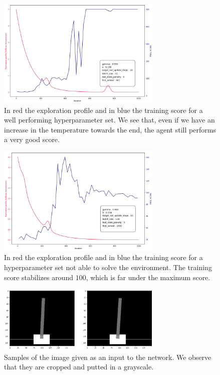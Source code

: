 \begin{figure}[h]
    \centering
    \includegraphics[width=0.7\textwidth]{Images/Good_Cartpole.png}
    \caption{In red the exploration profile and in blue the training score for a well performing hyperparameter set.
        We see that, even if we have an increase in the temperature towards the end, the agent still performs a very good score.}
    \label{fig:norm_cart}
\end{figure}

\begin{figure}[h]
    \centering
    \includegraphics[width=0.7\textwidth]{Images/Bad_Cartpole.png}
    \caption{In red the exploration profile and in blue the training score for a hyperparameter set not able to solve the environment.
        The training score stabilizes around $100$, which is far under the maximum score.}
    \label{fig:bad_cart}
\end{figure}

\begin{figure}[h]
    \centering
    \includegraphics[width=0.7\textwidth]{Images/Sample_Cart_Image.png}
    \caption{Samples of the image given as an input to the network. We observe that they are cropped and putted in a grayscale.}
    \label{fig:image}
\end{figure}

